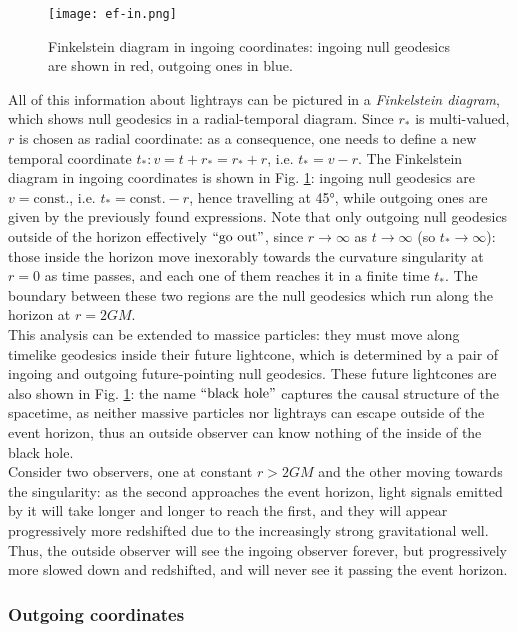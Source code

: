 \begin{figure}
  \centering
  \texttt{[image: ef-in.png]}
  \caption{Finkelstein diagram in ingoing coordinates: ingoing null geodesics are shown in red, outgoing ones in blue.}
  \label{ef-in}
\end{figure}

All of this information about lightrays can be pictured in a \textit{Finkelstein diagram}, which shows null geodesics in a radial-temporal diagram. Since $ r_* $ is multi-valued, $ r $ is chosen as radial coordinate: as a consequence, one needs to define a new temporal coordinate $ t_* : v = t + r_* = r_* + r $, i.e. $ t_* = v - r $. The Finkelstein diagram in ingoing coordinates is shown in Fig. \ref{ef-in}: ingoing null geodesics are $ v = \text{const.} $, i.e. $ t_* = \text{const.} - r $, hence travelling at 45°, while outgoing ones are given by the previously found expressions. Note that only outgoing null geodesics outside of the horizon effectively $ ``\text{go out}" $, since $ r \rightarrow \infty $ as $ t \rightarrow \infty $ (so $ t_* \rightarrow \infty $): those inside the horizon move inexorably towards the curvature singularity at $ r = 0 $ as time passes, and each one of them reaches it in a finite time $ t_* $. The boundary between these two regions are the null geodesics which run along the horizon at $ r = 2GM $.\\
This analysis can be extended to massice particles: they must move along timelike geodesics inside their future lightcone, which is determined by a pair of ingoing and outgoing future-pointing null geodesics. These future lightcones are also shown in Fig. \ref{ef-in}: the name $ ``\text{black hole}" $ captures the causal structure of the spacetime, as neither massive particles nor lightrays can escape outside of the event horizon, thus an outside observer can know nothing of the inside of the black hole.\\
Consider two observers, one at constant $ r > 2GM $ and the other moving towards the singularity: as the second approaches the event horizon, light signals emitted by it will take longer and longer to reach the first, and they will appear progressively more redshifted due to the increasingly strong gravitational well. Thus, the outside observer will see the ingoing observer forever, but progressively more slowed down and redshifted, and will never see it passing the event horizon.

\subsubsection{Outgoing coordinates}

